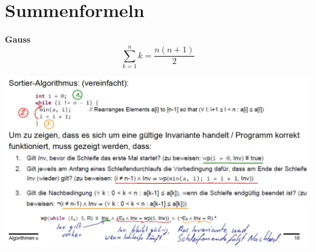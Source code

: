\section*{Summenformeln}

\textbf{Gauss}
\begin{equation}
    \sum_{k=1}^{n} k = \frac{n(n+1)}{2}
\end{equation}

\includegraphics[width=\linewidth]{images/invariante}